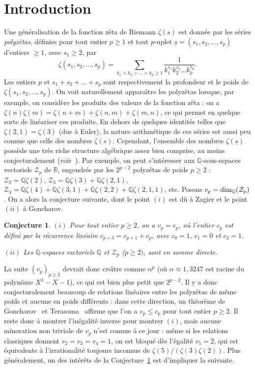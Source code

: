 \documentclass[12pt,francais, reqno]{smfart}
\numberwithin{equation}{section}
\def\al{\alpha}
\newcommand{\Q}{\mathbb Q}
\newtheorem{Conj}{Conjecture}
\begin{document}
\section{Introduction}\label{sec:1}
Une g\'en\'eralisation 
de la fonction z\^eta de Riemann $\zeta(s)$ est 
donn\'ee par les s\'eries {\em polyz\^etas}, d\'efinies pour tout entier 
$p\ge 1$ 
et tout $p$-uplet $\underline{s}=(s_1, s_2, \dots, s_p)$ 
d'entiers $\ge 1$,
avec $s_1\ge 2$, par
$$
\zeta(s_1, s_2, \ldots, s_p)=
\sum_{k_1> k_2>\ldots > k_p\ge 1}
\frac{1}{k_1^{s_1}k_2^{s_2}\ldots k_p^{s_p}}.
$$
Les entiers $p$ et  
$s_1+s_2+\ldots+s_p$ sont respectivement la profondeur et 
le poids de $\zeta(s_1, s_2, \ldots, s_p)$. 
On voit naturellement appara{\^\i}tre les polyz\^etas lorsque, par exemple,  
on consid{\`e}re les produits des valeurs de la fonction 
z\^eta : 
on a  $\zeta(n)\zeta(m)=\zeta(n+m)+\zeta(n,m)+\zeta(m,n)$, 
ce qui permet en 
quelque sorte  de {\og lin{\'e}ariser\fg} ces produits. 
En dehors de quelques identit\'es telles que $\zeta(2,1)=\zeta(3)$
 (due \`a Euler), 
la nature arithm\'etique de ces s\'eries est aussi peu connue que 
celle des nombres $\zeta(s)$. 
Cependant, l'ensemble des nombres $\zeta(\underline s)$ poss\`ede 
une tr\`es riche 
structure alg\'ebrique assez bien comprise, au moins 
conjecturalement (voir~\cite{MiW}). 
Par exemple, on peut s'int{\'e}resser
 aux $\Q$-sous-espaces vectoriels $\mathcal{Z}_p$ de
 $\mathbb{R}$, engendr{\'e}s par les $2^{p-2}$ polyz{\^e}tas de 
poids $p\ge 2$ :  $\mathcal{Z}_2=\Q\zeta(2)$, 
$\mathcal{Z}_3=\Q\zeta(3)+\Q\zeta(2,1)$, 
$\mathcal{Z}_4=\Q\zeta(4)+\Q\zeta(3,1)+
\Q\zeta(2,2)+
\Q\zeta(2,1,1)$, 
etc. Posons $v_p=\textup{dim}_{\Q}(\mathcal{Z}_p)$. 
On a alors la conjecture suivante, dont le point $(i)$ est d\^u 
\`a Zagier et le point $(ii)$ \`a Goncharov.

\begin{Conj}\label{conj:KZ} 
$(i)$ 
Pour tout entier $p\ge 2$, on a $v_p=c_p$, o{\`u} l'entier 
$c_p$ est d{\'e}fini par 
la r{\'e}currence  lin\'eaire 
$c_{p+3}=c_{p+1}+c_{p}$, 
avec $c_0=1$, $c_1=0$ et $c_2=1$.

 $(ii)$ Les $\Q$-espaces vectoriels $\Q$ et 
$\mathcal{Z}_p$ ($p\ge 2)$, sont en somme
directe.
\end{Conj}
La suite $(v_p)_{p\ge 2}$ devrait donc cro{\^\i}tre comme 
$\al^p$ (o{\`u} $\al\approx
1,3247$ est racine du 
polyn{\^o}me $X^3-X-1$), ce qui est  bien plus petit que 
$2^{p-2}$. Il y a 
donc conjecturalement beaucoup de relations lin{\'e}aires entre les polyz{\^e}tas 
de m{\^e}me poids 
et aucune en poids diff{\'e}rents : 
dans cette direction, un  
th{\'e}or{\`e}me de Goncharov~\cite{Goncharov} et Terasoma~\cite{terasoma}
affirme que l'on a  $v_p\le c_p$ pour tout entier $p\ge 2$. Il
reste donc {\`a} montrer l'in{\'e}galit{\'e} inverse pour montrer $(i)$,  mais aucune 
minoration non
triviale de $v_p$ n'est connue {\`a} ce jour : m\^eme si les relations classiques
donnent  $v_2=v_3=v_4=1$,  
on est bloqu{\'e} d{\`e}s l'{\'e}galit{\'e} $v_5=2$, qui 
est {\'e}quivalente 
{\`a} l'irrationalit{\'e} toujours inconnue de
$\zeta(5)/(\zeta(3)\zeta(2))$. 
Plus g\'en\'eralement, un des int\'er\^ets de la 
Conjecture~\ref{conj:KZ} est d'impliquer la 
suivante. 
\end{document}

